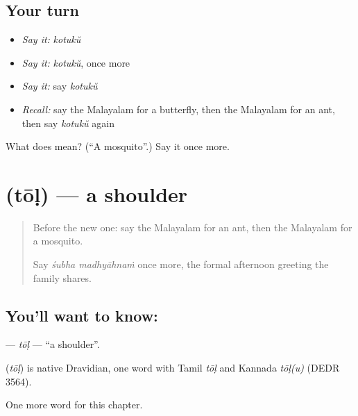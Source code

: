 \subsection*{Your turn}
\begin{itemize}
\raggedright
  \item \emph{Say it:} \emph{kotukŭ}
  \item \emph{Say it:} \emph{kotukŭ}, once more
  \item \emph{Say it:} say \emph{kotukŭ}
  \item \emph{Recall:} say the Malayalam for a butterfly, then the Malayalam for an ant, then say \emph{kotukŭ} again
\end{itemize}

\begin{tcolorbox}[breakable,colback=teal!4,colframe=teal!35!black,title={Before you move on}]
What does  mean? (\textquotedblleft{}A mosquito\textquotedblright{}.) Say it once more.
\end{tcolorbox}
\section[\texorpdfstring{\ml{തോൾ} (tōḷ)}{തോൾ (tōḷ)}]{ (tōḷ) — a shoulder}

\label{lesson:ML-C153-tol}



\begin{quote}
Before the new one: say the Malayalam for an ant, then the Malayalam for a mosquito.

Say \emph{śubha madhyāhnaṁ} once more, the formal afternoon greeting the family shares.
\end{quote}

\subsection*{You'll want to know: }
\textbf{} — \emph{tōḷ} — \textquotedblleft{}a shoulder\textquotedblright{}.

\begin{cousinweb}
\textbf{} (\emph{tōḷ}) is native Dravidian, one word with Tamil \emph{tōḷ} and Kannada \emph{tōḷ(u)} (DEDR 3564).
\end{cousinweb}

\begin{grammarlens}[title={What you've built}]
One more word for this chapter.
\end{grammarlens}

